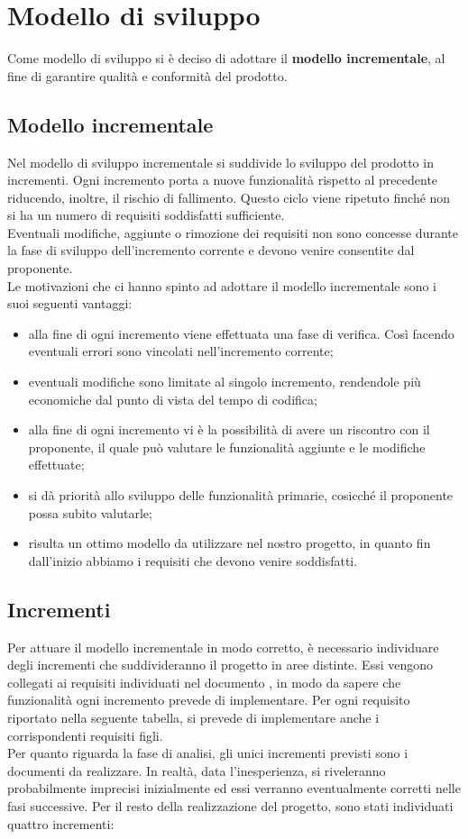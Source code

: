 \section{Modello di sviluppo}
Come modello di sviluppo si è deciso di adottare il \textbf{modello incrementale}, al fine di garantire qualità e conformità del prodotto.

\subsection{Modello incrementale}
Nel modello di sviluppo incrementale si suddivide lo sviluppo del prodotto in incrementi. Ogni incremento porta a nuove funzionalità rispetto al precedente riducendo, inoltre, il rischio di fallimento. Questo ciclo viene ripetuto finché non si ha un numero di requisiti soddisfatti sufficiente.\\
Eventuali modifiche, aggiunte o rimozione dei requisiti non sono concesse durante la fase di sviluppo dell'incremento corrente e devono venire consentite dal proponente.\\
Le motivazioni che ci hanno spinto ad adottare il modello incrementale sono i suoi seguenti vantaggi:
\begin{itemize}
\item alla fine di ogni incremento viene effettuata una fase di verifica. Così facendo eventuali errori sono vincolati nell'incremento corrente;
\item eventuali modifiche sono limitate al singolo incremento, rendendole più economiche dal punto di vista del tempo di codifica;
\item alla fine di ogni incremento vi è la possibilità di avere un riscontro con il proponente, il quale può valutare le funzionalità aggiunte e le modifiche effettuate;
\item si dà priorità allo sviluppo delle funzionalità primarie, cosicché il proponente possa subito valutarle;
\item risulta un ottimo modello da utilizzare nel nostro progetto, in quanto fin dall'inizio abbiamo i requisiti che devono venire soddisfatti.
\end{itemize}

\subsection{Incrementi}
Per attuare il modello incrementale in modo corretto, è necessario individuare degli incrementi che suddivideranno il progetto in aree distinte. Essi vengono collegati ai requisiti individuati nel documento \AdRv{}, in modo da sapere che funzionalità ogni incremento prevede di implementare. Per ogni requisito riportato nella seguente tabella, si prevede di implementare anche i corrispondenti requisiti figli. \\
Per quanto riguarda la fase di analisi, gli unici incrementi previsti sono i documenti da realizzare. In realtà, data l'inesperienza, si riveleranno probabilmente imprecisi inizialmente ed essi verranno eventualmente corretti nelle fasi successive.
Per il resto della realizzazione del progetto, sono stati individuati quattro incrementi:

